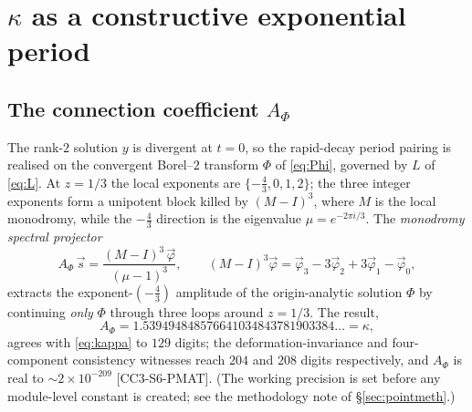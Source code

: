 \documentclass[11pt,reqno]{amsart}
\theoremstyle{plain}
\theoremstyle{definition}
\theoremstyle{remark}
\newcommand{\claim}[1]{\textsf{\small[#1]}}
\begin{document}
\section{$\kappa$ as a constructive exponential period}\label{sec:period}

\subsection{The connection coefficient $A_{\Phi}$}\label{sec:Aphi}
The rank-$2$ solution $y$ is divergent at $t=0$, so the rapid-decay period
pairing is realised on the convergent Borel--$2$ transform $\Phi$ of
\eqref{eq:Phi}, governed by $L$ of \eqref{eq:L}. At $z=1/3$ the local exponents
are $\{-\tfrac43,0,1,2\}$; the three integer exponents form a unipotent block
killed by $(M-I)^{3}$, where $M$ is the local monodromy, while the $-\tfrac43$
direction is the eigenvalue $\mu=e^{-2\pi i/3}$. The \emph{monodromy spectral
projector}
\begin{equation}\label{eq:proj}
  A_{\Phi}\,\vec{s}=\frac{(M-I)^{3}\,\vec{\varphi}}{(\mu-1)^{3}},\qquad
  (M-I)^{3}\vec\varphi=\vec\varphi_{3}-3\vec\varphi_{2}+3\vec\varphi_{1}
  -\vec\varphi_{0},
\end{equation}
extracts the exponent-$(-\tfrac43)$ amplitude of the origin-analytic solution
$\Phi$ by continuing \emph{only} $\Phi$ through three loops around $z=1/3$. The
result,
\begin{equation}\label{eq:AphiVal}
  A_{\Phi}=1.539494848576641034843781903384\ldots=\kappa,
\end{equation}
agrees with \eqref{eq:kappa} to $129$ digits; the deformation-invariance and
four-component consistency witnesses reach $204$ and $208$ digits respectively,
and $A_{\Phi}$ is real to $\sim\!2\times10^{-209}$ \claim{CC3-S6-PMAT}. (The
working precision is set before any module-level constant is created; see the
methodology note of \S\ref{sec:pointmeth}.)
\end{document}
